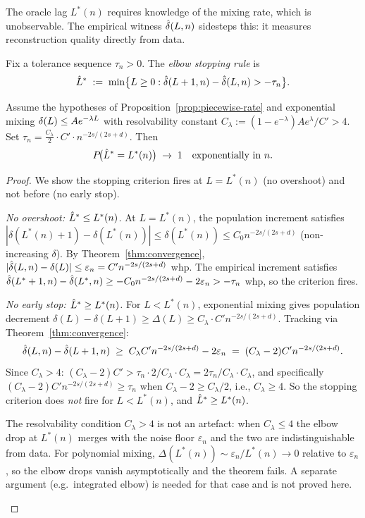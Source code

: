 The oracle lag $L^*(n)$ requires knowledge of the mixing rate, which is
unobservable.
The empirical witness $\hat{\delta}(L,n)$ sidesteps this: it measures reconstruction
quality directly from data.

\begin{definition}
\label{def:elbow}
Fix a tolerance sequence $\tau_n > 0$.
The \emph{elbow stopping rule} is
\[
  \hat{L}^* \;:=\; \min\bigl\{L \geq 0 :
    \hat{\delta}(L+1,n) - \hat{\delta}(L,n) > -\tau_n\bigr\}.
\]
\end{definition}

\begin{theorem}
\label{thm:elbow}
Assume the hypotheses of Proposition~\ref{prop:piecewise-rate} and
exponential mixing $\delta(L) \leq A e^{-\lambda L}$ with resolvability constant
$C_\lambda := (1-e^{-\lambda}) A e^\lambda / C' > 4$.
Set $\tau_n = \frac{C_\lambda}{2} \cdot C' \cdot n^{-2s/(2s+d)}$.
Then
\[
  P\!\bigl(\hat{L}^* = L^*(n)\bigr) \;\to\; 1
  \quad\text{exponentially in } n.
\]
\end{theorem}

\begin{proof}
We show the stopping criterion fires at $L = L^*(n)$ (no overshoot)
and not before (no early stop).

\emph{No overshoot: $\hat{L}^* \leq L^*(n)$.}
At $L = L^*(n)$, the population increment satisfies
$|\delta(L^*(n)+1) - \delta(L^*(n))| \leq \delta(L^*(n)) \leq C_0 n^{-2s/(2s+d)}$ (non-increasing $\delta$).
By Theorem~\ref{thm:convergence}, $|\hat{\delta}(L,n) - \delta(L)| \leq \varepsilon_n = C' n^{-2s/(2s+d)}$ whp.
The empirical increment satisfies
$\hat{\delta}(L^*+1,n) - \hat{\delta}(L^*,n) \geq -C_0 n^{-2s/(2s+d)} - 2\varepsilon_n > -\tau_n$ whp,
so the criterion fires.

\emph{No early stop: $\hat{L}^* \geq L^*(n)$.}
For $L < L^*(n)$, exponential mixing gives population decrement
$\delta(L) - \delta(L+1) \geq \Delta(L) \geq C_\lambda \cdot C' n^{-2s/(2s+d)}$.
Tracking via Theorem~\ref{thm:convergence}:
\[
  \hat{\delta}(L,n) - \hat{\delta}(L+1,n)
  \;\geq\; C_\lambda C' n^{-2s/(2s+d)} - 2\varepsilon_n
  \;=\; (C_\lambda - 2)C' n^{-2s/(2s+d)}.
\]
Since $C_\lambda > 4$: $(C_\lambda - 2)C' > \tau_n \cdot 2/C_\lambda \cdot C_\lambda = 2\tau_n/C_\lambda \cdot C_\lambda$,
and specifically $(C_\lambda - 2)C' n^{-2s/(2s+d)} \geq \tau_n$ when
$C_\lambda - 2 \geq C_\lambda/2$, i.e., $C_\lambda \geq 4$.
So the stopping criterion does \emph{not} fire for $L < L^*(n)$, and $\hat{L}^* \geq L^*(n)$.

\begin{remark}
The resolvability condition $C_\lambda > 4$ is not an artefact: when
$C_\lambda \leq 4$ the elbow drop at $L^*(n)$ merges with the noise floor
$\varepsilon_n$ and the two are indistinguishable from data.
For polynomial mixing, $\Delta(L^*(n)) \sim \varepsilon_n / L^*(n) \to 0$
relative to $\varepsilon_n$, so the elbow drops vanish asymptotically and
the theorem fails.
A separate argument (e.g.\ integrated elbow) is needed for that case and is
not proved here.
\end{remark}
\end{proof}

